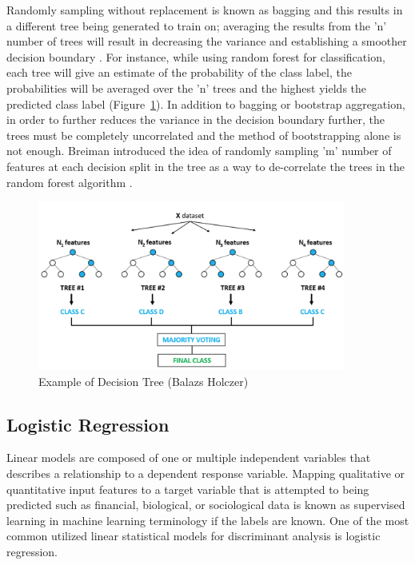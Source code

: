 \documentclass{llncs}
\begin{document}
\noindent 
Randomly sampling without replacement is known as bagging and this results in a different tree being generated to train on; averaging the results from the 'n' number of trees will result in decreasing the variance and establishing a smoother decision boundary \cite{hastie}. For instance, while using random forest for classification, each tree will give an estimate of the probability of the class label, the probabilities will be averaged over the 'n' trees and the highest yields the predicted class label (Figure~\ref{fig:rftree}). In addition to bagging or bootstrap aggregation, in order to further reduces the variance in the decision boundary further, the trees must be completely uncorrelated and the method of bootstrapping alone is not enough. Breiman introduced the idea of randomly sampling 'm' number of features at each decision split in the tree as a way to de-correlate the trees in the random forest algorithm \cite{breiman}.  


\begin{figure}
\centering
\includegraphics[width=0.90\textwidth]{randomforest.png}
\caption{Example of Decision Tree (Balazs Holczer)}
\label{fig:rftree}
\end{figure}

\subsection{Logistic Regression}

\noindent 
Linear models are composed of one or multiple independent variables that describes a relationship to a dependent response variable. Mapping qualitative or quantitative input features to a target variable that is attempted to being predicted such as financial, biological, or sociological data is known as supervised learning in machine learning terminology if the labels are known.  One of the most common utilized linear statistical models for discriminant analysis is logistic regression.
\end{document}
